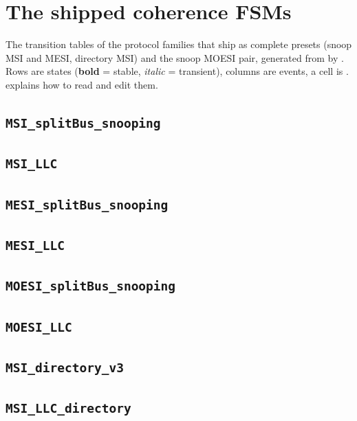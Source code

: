 \chapter{The shipped coherence FSMs}\label{app:fsm-tables}

The transition tables of the protocol families that ship as complete presets (snoop MSI and
MESI, directory MSI) and the snoop MOESI pair, generated from  by
. Rows are states (\textbf{bold} = stable,
\emph{italic} = transient), columns are events, a cell is .
 explains how to read and edit them.

\section{\texttt{MSI\_splitBus\_snooping}}
\section{\texttt{MSI\_LLC}}
\section{\texttt{MESI\_splitBus\_snooping}}
\section{\texttt{MESI\_LLC}}
\section{\texttt{MOESI\_splitBus\_snooping}}
\section{\texttt{MOESI\_LLC}}
\section{\texttt{MSI\_directory\_v3}}
\section{\texttt{MSI\_LLC\_directory}}
